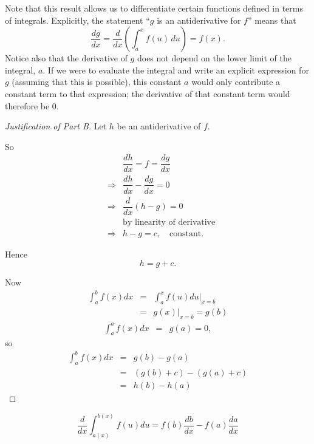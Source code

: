 Note that this result allows us to differentiate certain functions defined in terms of integrals.  Explicitly, the statement ``$g$ is an antiderivative for $f$'' means that
  \[
    \frac{dg}{dx} = \frac{d}{dx}\left(\int_{a}^{x} f(u) \, du\right) = f(x).
  \]
Notice also that the derivative of $g$ does not depend on the lower limit of the integral, $a$.  If we were to evaluate the integral and write an explicit expression for $g$ (assuming that this is possible), this constant $a$ would only contribute a constant term to that expression; the derivative of that constant term would therefore be $0$.



\begin{proof}[Justification of Part B]

Let $h$ be an antiderivative of $f$.

So
\begin{eqnarray*}
 && \dfrac{dh}{dx} = f = \dfrac{dg}{dx}\\
 &\Longrightarrow& \dfrac{dh}{dx} - \dfrac{dg}{dx} = 0\\
 &\Longrightarrow& \dfrac{d}{dx}(h-g) = 0\\
 && \text{by linearity of derivative}\\
 &\Longrightarrow& h-g=c, \quad \text{constant}.
\end{eqnarray*}

Hence
\[
 h=g+c.
\]

Now
\begin{eqnarray*}
 \int_{a}^{b} f(x)dx &=& \int_{a}^{x} f(u)du \Big|_{x=b}\\
 &=& g(x)\Big|_{x=b} = g(b)
\end{eqnarray*}
\begin{eqnarray*}
 \int_{a}^{a} f(x)dx &=& g(a)=0,
\end{eqnarray*}
so
\begin{eqnarray*}
 \int_{a}^{b} f(x)dx &=&  g(b) - g(a)\\
 &=& (g(b)+c) - (g(a)+c)\\
 &=& h(b) - h(a)
\end{eqnarray*}

\end{proof}

\begin{corollary}
 \[
  \dfrac{d}{dx} \int_{a(x)}^{b(x)} f(u)du = f(b) \dfrac{db}{dx} - f(a) \dfrac{da}{dx}
 \]
\end{corollary}

